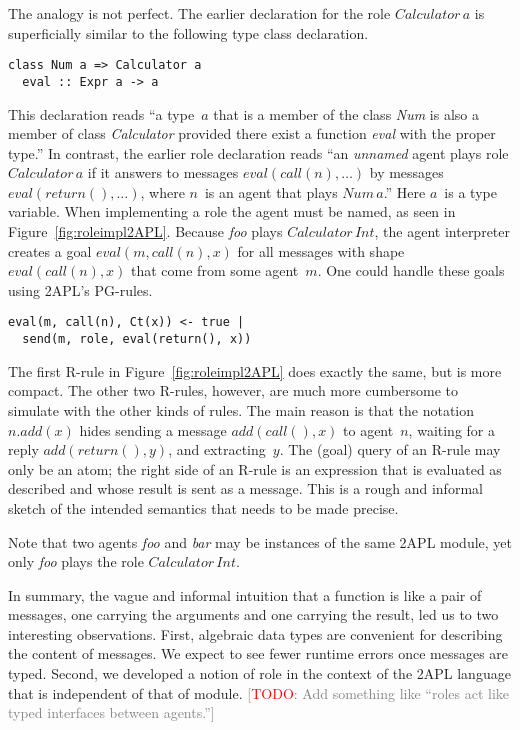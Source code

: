 \documentclass[conference,compsoc]{IEEEtran} %
\newcommand{\todo}[1]{{\small \textcolor{gray}{[\textcolor{red}{TODO}: #1]}}}
\begin{document}
The analogy is not perfect. The earlier declaration for the role
$\mathit{Calculator}\,a$ is superficially similar to the following type
class declaration.
\begin{lstlisting}[style=hs]
class Num a => Calculator a
  eval :: Expr a -> a
\end{lstlisting}
This declaration reads ``a type~$a$ that is a member of the class
\textit{Num} is also a member of class \textit{Calculator} provided there
exist a function \textit{eval} with the proper type.'' In contrast, the
earlier role declaration reads ``an \emph{unnamed} agent plays role
$\mathit{Calculator}\,a$ if it answers to messages
$\mathit{eval}(\mathit{call}(n),\ldots)$ by messages
$\mathit{eval}(\mathit{return}(),\ldots)$, where $n$~is an agent that plays
$\mathit{Num}\,a$.'' Here $a$~is a type variable.  When implementing a role
the agent must be named, as seen in Figure~\ref{fig:roleimpl2APL}. Because
\textit{foo} plays $\mathit{Calculator}\,\mathit{Int}$, the agent
interpreter creates a goal $\mathit{eval}(m,\mathit{call}(n),x)$ for all
messages with shape $\mathit{eval}(\mathit{call}(n),x)$ that come from some
agent~$m$.  One could handle these goals using 2APL's PG-rules.
\begin{lstlisting}[style=me]
eval(m, call(n), Ct(x)) <- true |
  send(m, role, eval(return(), x))
\end{lstlisting}
The first R-rule in Figure~\ref{fig:roleimpl2APL} does exactly the same,
but is more compact. The other two R-rules, however, are much more
cumbersome to simulate with the other kinds of rules. The main reason is
that the notation $n.\mathit{add}(x)$ hides sending a message
$\mathit{add}(\mathit{call}(),x)$ to agent~$n$, waiting for a reply
$\mathit{add}(\mathit{return}(),y)$, and extracting~$y$. The (goal) query
of an R-rule may only be an atom; the right side of an R-rule is an
expression that is evaluated as described and whose result is sent as a
message.  This is a rough and informal sketch of the intended semantics
that needs to be made precise.

Note that two agents \textit{foo} and \textit{bar} may be instances of the
same 2APL module, yet only \textit{foo} plays the role
$\mathit{Calculator}\,\mathit{Int}$.

In summary, the vague and informal intuition that a function is like a pair
of messages, one carrying the arguments and one carrying the result, led
us to two interesting observations. First, algebraic data types are
convenient for describing the content of messages. We expect to see fewer
runtime errors once messages are typed. Second, we developed a notion of
role in the context of the 2APL language that is independent of that of
module. \todo{Add something like ``roles act like typed interfaces between
agents.''}
\end{document}
